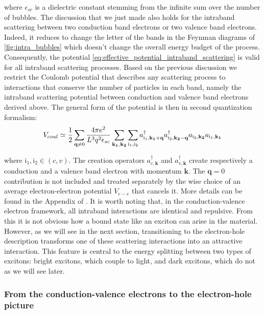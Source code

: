 where $\epsilon_{sc}$ is a dielectric constant stemming from the infinite sum over the number of bubbles. The discussion that we just made also holds for the intraband scattering between two conduction band electrons or two valence band electrons.
Indeed, it reduces to change the letter of the bands in the Feynman diagrams of \autoref{fig:intra_bubbles} which doesn't change the overall energy budget of the process. Consequently, the potential \eqref{eq:effective_potential_intraband_scattering} is valid for all intraband scattering processes.
Based on the previous discussion we restrict the Coulomb potential that describes any scattering process to interactions that conserve the number of particles in each band, namely the intraband scattering potential between conduction and valence band electrons derived above.
The general form of the potential is then in second quantization formalism:
\begin{equation}
    V_{coul}\simeq \dfrac{1}{2}\sum_{\textbf{q}\neq 0}\dfrac{4\pi e^2}{L^3q^2\epsilon_{sc}}\sum_{\mathbf{k_{1}, k_{2}}}\sum_{\mathrm{i_1,i_2}} a^{\dagger}_{\mathrm{i_{1}},\mathbf{k_1+q}}a^{\dagger}_{\mathrm{i_{2}},\mathbf{k_2-q}}a_{\mathrm{i_{2}},\mathbf{k_2}}a_{\mathrm{i_{1}},\mathbf{k_1}}
\end{equation}

\noindent where $\mathrm{i_1,i_2} \in (c,v)$. The creation operators $a^{\dagger}_{c,\mathbf{k}}$ and $a^{\dagger}_{v,\mathbf{k}}$ create respectively a conduction and a valence band electron with momentum $\mathbf{k}$.
The $\textbf{q}=0$ contribution is not included and treated separately by the wise choice of an average electron-electron potential $V_{e-e}$ that cancels it. More details can be found in the Appendix of \cite{Combescot_cooper_excitons_2015}.
It is worth noting that, in the conduction-valence electron framework, all intraband interactions are identical and repulsive. From this it is not obvious how a bound state like an exciton can arise in the material. However, as we will see in the next section, transitioning to the electron-hole description transforms one of these scattering interactions into an attractive interaction.
 This feature is central to the energy splitting between two types of excitons: bright excitons, which couple to light, and dark excitons, which do not as we will see later.

\subsubsection{From the conduction-valence electrons to the electron-hole picture}

